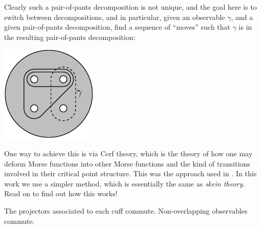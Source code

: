 \documentclass[aps, prl, letterpaper, twocolumn, superscriptaddress, notitlepage, 10pt]{revtex4-1}
\begin{document}
Clearly such a pair-of-pants decomposition is not unique,
and the goal here is to switch between decompositions,
and in particular, given an observable $\gamma$,
and a given pair-of-pants decomposition, find a sequence
of ``moves'' such that $\gamma$ is in the resulting pair-of-pants
decomposition:
\begin{center}
\includegraphics[]{pic-refactor.pdf}
\end{center}

One way to achieve this is via Cerf theory, which is the theory
of how one may deform Morse functions into other Morse functions
and the kind of transitions involved in their critical point structure.
This was the approach used in \cite{Freedman2002simulation}.
In this work we use a simpler method,
which is essentially the same as \emph{skein theory.}
Read on to find out how this works!

The projectors associated to each cuff commute.
Non-overlapping observables commute.
\end{document}
